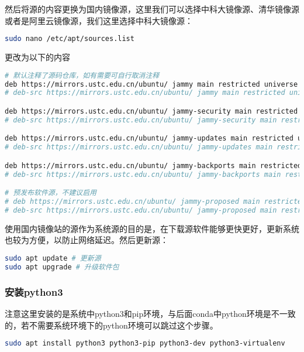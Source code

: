 \documentclass[lang=cn,a4paper,newtx]{elegantpaper}
\begin{document}
然后将源的内容更换为国内镜像源，这里我们可以选择中科大镜像源、清华镜像源或者是阿里云镜像源，我们这里选择中科大镜像源：

\begin{lstlisting}[language=bash]
sudo nano /etc/apt/sources.list
\end{lstlisting}

更改为以下的内容
\begin{lstlisting}[language=bash]
# 默认注释了源码仓库，如有需要可自行取消注释
deb https://mirrors.ustc.edu.cn/ubuntu/ jammy main restricted universe multiverse
# deb-src https://mirrors.ustc.edu.cn/ubuntu/ jammy main restricted universe multiverse

deb https://mirrors.ustc.edu.cn/ubuntu/ jammy-security main restricted universe multiverse
# deb-src https://mirrors.ustc.edu.cn/ubuntu/ jammy-security main restricted universe multiverse

deb https://mirrors.ustc.edu.cn/ubuntu/ jammy-updates main restricted universe multiverse
# deb-src https://mirrors.ustc.edu.cn/ubuntu/ jammy-updates main restricted universe multiverse

deb https://mirrors.ustc.edu.cn/ubuntu/ jammy-backports main restricted universe multiverse
# deb-src https://mirrors.ustc.edu.cn/ubuntu/ jammy-backports main restricted universe multiverse

# 预发布软件源，不建议启用
# deb https://mirrors.ustc.edu.cn/ubuntu/ jammy-proposed main restricted universe multiverse
# deb-src https://mirrors.ustc.edu.cn/ubuntu/ jammy-proposed main restricted universe multiverse  
\end{lstlisting}

使用国内镜像站的源作为系统源的目的是，在下载源软件能够更快更好，更新系统也较为方便，以防止网络延迟。然后更新源：
\begin{lstlisting}[language=bash]
sudo apt update # 更新源
sudo apt upgrade # 升级软件包  
\end{lstlisting}

\subsubsection{安装python3}
注意这里安装的是系统中python3和pip环境，与后面conda中python环境是不一致的，若不需要系统环境下的python环境可以跳过这个步骤。
\begin{lstlisting}[language=bash]
sudo apt install python3 python3-pip python3-dev python3-virtualenv
\end{lstlisting}
\end{document}
